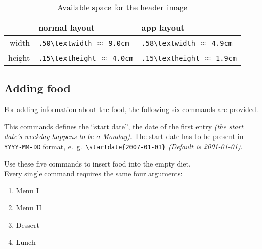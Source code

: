 \documentclass[11pt]{ltxdoc}
\begin{document}
	\begin{table}[b]\centering\sffamily\small\renewcommand{\arraystretch}{1.25}
		\begin{tabular}{r*{2}{|>{\centering\ttfamily}m{.25\textwidth}<{\arraybackslash}}}
			       & \textsf{normal layout}                                & app \textsf{layout}                                   \tabularnewline\hline\hline
			 width & \verb|.50\textwidth|  \newline $\approx$ \verb|9.0cm| & \verb|.58\textwidth|  \newline $\approx$ \verb|4.9cm| \tabularnewline\hline
			height & \verb|.15\textheight| \newline $\approx$ \verb|4.0cm| & \verb|.15\textheight| \newline $\approx$ \verb|1.9cm|
		\end{tabular}
	
		\rmfamily
		\caption{Available space for the header image}
		\label{tab:image-sizes}
	\end{table}
	
	
	\subsection{Adding food}
	For adding information about the food, the following six commands are provided.
	
	\medskip
	\DescribeMacro{\startdate}
	This commands defines the \enquote{start date}, the date of the first entry \textit{(the start date's weekday happens to be a Monday)}.	The start date has to be present in \texttt{YYYY-MM-DD} format, e.~g.~\verb|\startdate{2007-01-01}| \textit{(Default is 2001-01-01)}.
	
	\medskip
	\DescribeMacro{\monday}\DescribeMacro{\tuesday}\DescribeMacro{\wednesday}\DescribeMacro{\thursday}\DescribeMacro{\friday}
	Use these five commands to insert food into the empty diet. \\
	Every single command requires the same four arguments:
	\begin{multicols}{4}
		\begin{enumerate}\itemsep0pt
			\item Menu I
			\item Menu II
			\item Dessert
			\item Lunch
		\end{enumerate}
	\end{multicols}
\end{document}
